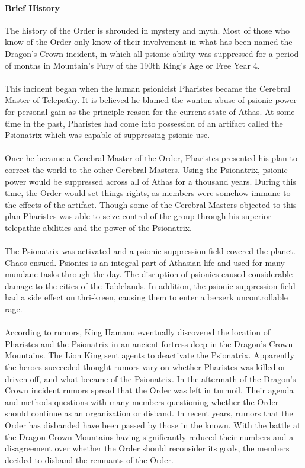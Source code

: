 \begin{multicols}{2}
\paragraph{Brief History}
The history of the Order is shrouded in mystery and
myth. Most of those who know of the Order only know of
their involvement in what has been named the Dragon’s
Crown incident, in which all psionic ability was
suppressed for a period of months in Mountain’s Fury of
the 190th King’s Age or Free Year 4.\\
\\
This incident began when the human psionicist
Pharistes became the Cerebral Master of Telepathy. It is
believed he blamed the wanton abuse of psionic power
for personal gain as the principle reason for the current
state of Athas. At some time in the past, Pharistes had
come into possession of an artifact called the Psionatrix
which was capable of suppressing psionic use.\\
\\
Once he became a Cerebral Master of the Order,
Pharistes presented his plan to correct the world to the
other Cerebral Masters. Using the Psionatrix, psionic
power would be suppressed across all of Athas for a
thousand years. During this time, the Order would set
things rights, as members were somehow immune to the
effects of the artifact. Though some of the Cerebral
Masters objected to this plan Pharistes was able to seize
control of the group through his superior telepathic
abilities and the power of the Psionatrix.\\
\\
The Psionatrix was activated and a psionic
suppression field covered the planet. Chaos ensued.
Psionics is an integral part of Athasian life and used for
many mundane tasks through the day. The disruption of
psionics caused considerable damage to the cities of the
Tablelands. In addition, the psionic suppression field had
a side effect on thri‐kreen, causing them to enter a berserk
uncontrollable rage.\\
\\
According to rumors, King Hamanu eventually
discovered the location of Pharistes and the Psionatrix in
an ancient fortress deep in the Dragon’s Crown
Mountains. The Lion King sent agents to deactivate the
Psionatrix. Apparently the heroes succeeded thought
rumors vary on whether Pharistes was killed or driven
off, and what became of the Psionatrix.
In the aftermath of the Dragon’s Crown incident
rumors spread that the Order was left in turmoil. Their
agenda and methods questions with many members
questioning whether the Order should continue as an
organization or disband. In recent years, rumors that the
Order has disbanded have been passed by those in the
known. With the battle at the Dragon Crown Mountains
having significantly reduced their numbers and a
disagreement over whether the Order should reconsider
its goals, the members decided to disband the remnants of
the Order.\\


\end{multicols}

